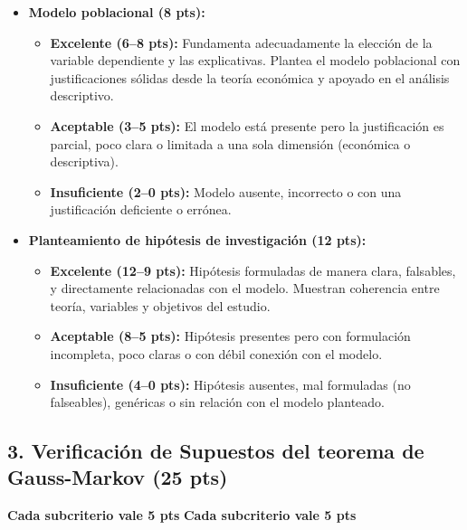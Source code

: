 \documentclass{article}
\begin{document}
\begin{itemize}

  \item \textbf{Modelo poblacional (8 pts):}
    \begin{itemize}
      \item \textbf{Excelente (6--8 pts):} Fundamenta adecuadamente la elección de la variable dependiente y las explicativas. Plantea el modelo poblacional con justificaciones sólidas desde la teoría económica y apoyado en el análisis descriptivo.
      \item \textbf{Aceptable (3--5 pts):} El modelo está presente pero la justificación es parcial, poco clara o limitada a una sola dimensión (económica o descriptiva).
      \item \textbf{Insuficiente (2--0 pts):} Modelo ausente, incorrecto o con una justificación deficiente o errónea.
    \end{itemize}

  \item \textbf{Planteamiento de hipótesis de investigación (12 pts):}
    \begin{itemize}
      \item \textbf{Excelente (12--9 pts):} Hipótesis formuladas de manera clara, falsables, y directamente relacionadas con el modelo. Muestran coherencia entre teoría, variables y objetivos del estudio.
      \item \textbf{Aceptable (8--5 pts):} Hipótesis presentes pero con formulación incompleta, poco claras o con débil conexión con el modelo.
      \item \textbf{Insuficiente (4--0 pts):} Hipótesis ausentes, mal formuladas (no falseables), genéricas o sin relación con el modelo planteado.
    \end{itemize}

\end{itemize}


\subsection*{3. Verificaci\'on de Supuestos del teorema de Gauss-Markov (25 pts)}
\textbf{Cada subcriterio vale 5 pts}
\textbf{Cada subcriterio vale 5 pts}
\end{document}
